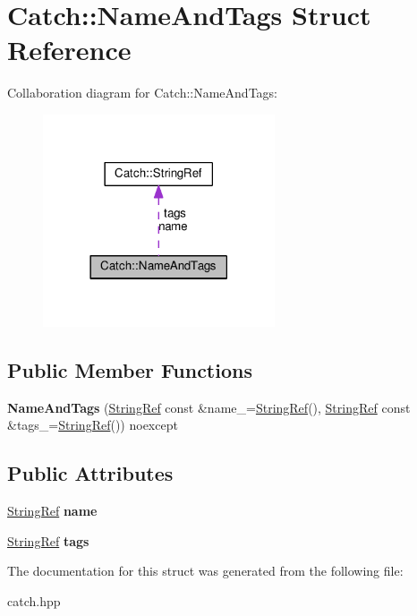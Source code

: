 \hypertarget{structCatch_1_1NameAndTags}{}\section{Catch\+:\+:Name\+And\+Tags Struct Reference}
\label{structCatch_1_1NameAndTags}


Collaboration diagram for Catch\+:\+:Name\+And\+Tags\+:\nopagebreak
\begin{figure}[H]
\begin{center}
\leavevmode
\includegraphics[width=194pt]{structCatch_1_1NameAndTags__coll__graph}
\end{center}
\end{figure}
\subsection*{Public Member Functions}
\begin{DoxyCompactItemize}
\item 
{\bfseries Name\+And\+Tags} (\hyperlink{classCatch_1_1StringRef}{String\+Ref} const \&name\+\_\+=\hyperlink{classCatch_1_1StringRef}{String\+Ref}(), \hyperlink{classCatch_1_1StringRef}{String\+Ref} const \&tags\+\_\+=\hyperlink{classCatch_1_1StringRef}{String\+Ref}()) noexcept\hypertarget{structCatch_1_1NameAndTags_ab585111e615ce8c504a2b9630de8ee94}{}\label{structCatch_1_1NameAndTags_ab585111e615ce8c504a2b9630de8ee94}

\end{DoxyCompactItemize}
\subsection*{Public Attributes}
\begin{DoxyCompactItemize}
\item 
\hyperlink{classCatch_1_1StringRef}{String\+Ref} {\bfseries name}\hypertarget{structCatch_1_1NameAndTags_a7cbea60e0cebfa622c667008eb011420}{}\label{structCatch_1_1NameAndTags_a7cbea60e0cebfa622c667008eb011420}

\item 
\hyperlink{classCatch_1_1StringRef}{String\+Ref} {\bfseries tags}\hypertarget{structCatch_1_1NameAndTags_a74062ed1138834a348424eb7ed900c57}{}\label{structCatch_1_1NameAndTags_a74062ed1138834a348424eb7ed900c57}

\end{DoxyCompactItemize}


The documentation for this struct was generated from the following file\+:\begin{DoxyCompactItemize}
\item 
catch.\+hpp\end{DoxyCompactItemize}
